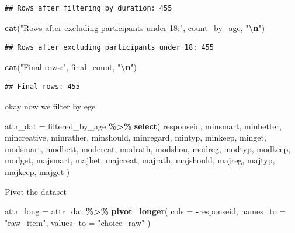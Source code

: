 \documentclass[
]{article}
\newenvironment{Shaded}{\begin{snugshade}}{\end{snugshade}}
\newcommand{\AttributeTok}[1]{\textcolor[rgb]{0.13,0.29,0.53}{#1}}
\newcommand{\FunctionTok}[1]{\textcolor[rgb]{0.13,0.29,0.53}{\textbf{#1}}}
\newcommand{\NormalTok}[1]{#1}
\newcommand{\OtherTok}[1]{\textcolor[rgb]{0.56,0.35,0.01}{#1}}
\newcommand{\SpecialCharTok}[1]{\textcolor[rgb]{0.81,0.36,0.00}{\textbf{#1}}}
\newcommand{\StringTok}[1]{\textcolor[rgb]{0.31,0.60,0.02}{#1}}
\begin{document}
\begin{verbatim}
## Rows after filtering by duration: 455
\end{verbatim}

\begin{Shaded}
\begin{Highlighting}[]
\FunctionTok{cat}\NormalTok{(}\StringTok{"Rows after excluding participants under 18:"}\NormalTok{, count\_by\_age, }\StringTok{"}\SpecialCharTok{\textbackslash{}n}\StringTok{"}\NormalTok{)}
\end{Highlighting}
\end{Shaded}

\begin{verbatim}
## Rows after excluding participants under 18: 455
\end{verbatim}

\begin{Shaded}
\begin{Highlighting}[]
\FunctionTok{cat}\NormalTok{(}\StringTok{"Final rows:"}\NormalTok{, final\_count, }\StringTok{"}\SpecialCharTok{\textbackslash{}n}\StringTok{"}\NormalTok{)}
\end{Highlighting}
\end{Shaded}

\begin{verbatim}
## Final rows: 455
\end{verbatim}

okay now we filter by ege

\begin{Shaded}
\begin{Highlighting}[]
\NormalTok{attr\_dat }\OtherTok{=}\NormalTok{ filtered\_by\_age }\SpecialCharTok{\%\textgreater{}\%}
  \FunctionTok{select}\NormalTok{(}
\NormalTok{    responseid,}
\NormalTok{    minsmart, minbetter, mincreative, minrather, minshould, minregard, mintyp, minkeep, minget,}
\NormalTok{    modsmart, modbett, modcreat, modrath, modshou, modreg, modtyp, modkeep, modget,}
\NormalTok{    majsmart, majbet, majcreat, majrath, majshould, majreg, majtyp, majkeep, majget}
\NormalTok{  )}
\end{Highlighting}
\end{Shaded}

Pivot the dataset

\begin{Shaded}
\begin{Highlighting}[]
\NormalTok{attr\_long }\OtherTok{=}\NormalTok{ attr\_dat }\SpecialCharTok{\%\textgreater{}\%}
  \FunctionTok{pivot\_longer}\NormalTok{(}
    \AttributeTok{cols =} \SpecialCharTok{{-}}\NormalTok{responseid,}
    \AttributeTok{names\_to =} \StringTok{"raw\_item"}\NormalTok{,}
    \AttributeTok{values\_to =} \StringTok{"choice\_raw"}
\NormalTok{  )}
\end{Highlighting}
\end{Shaded}
\end{document}
